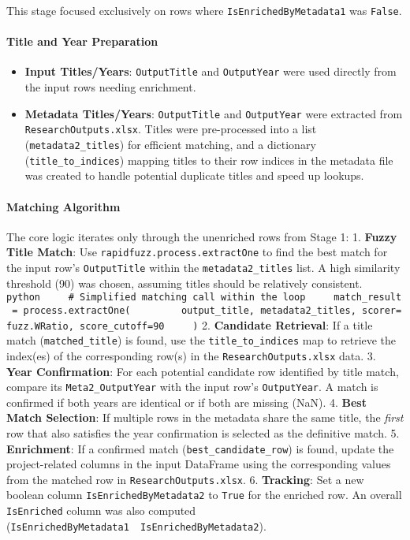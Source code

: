 \documentclass[12pt]{article}
\providecommand{\tightlist}{%
  \setlength{\itemsep}{0pt}\setlength{\parskip}{0pt}}
\begin{document}
This stage focused exclusively on rows where
\texttt{IsEnrichedByMetadata1} was \texttt{False}.

\paragraph{Title and Year
Preparation}\label{title-and-year-preparation}

\begin{itemize}
\tightlist
\item
  \textbf{Input Titles/Years}: \texttt{OutputTitle} and
  \texttt{OutputYear} were used directly from the input rows needing
  enrichment.
\item
  \textbf{Metadata Titles/Years}: \texttt{OutputTitle} and
  \texttt{OutputYear} were extracted from \texttt{ResearchOutputs.xlsx}.
  Titles were pre-processed into a list (\texttt{metadata2\_titles}) for
  efficient matching, and a dictionary (\texttt{title\_to\_indices})
  mapping titles to their row indices in the metadata file was created
  to handle potential duplicate titles and speed up lookups.
\end{itemize}

\paragraph{Matching Algorithm}\label{matching-algorithm-1}

The core logic iterates only through the unenriched rows from Stage 1:
1. \textbf{Fuzzy Title Match}: Use \texttt{rapidfuzz.process.extractOne}
to find the best match for the input row's \texttt{OutputTitle} within
the \texttt{metadata2\_titles} list. A high similarity threshold (90)
was chosen, assuming titles should be relatively consistent.
\texttt{python\ \ \ \ \ \#\ Simplified\ matching\ call\ within\ the\ loop\ \ \ \ \ match\_result\ =\ process.extractOne(\ \ \ \ \ \ \ \ \ output\_title,\ metadata2\_titles,\ scorer=fuzz.WRatio,\ score\_cutoff=90\ \ \ \ \ )}
2. \textbf{Candidate Retrieval}: If a title match
(\texttt{matched\_title}) is found, use the \texttt{title\_to\_indices}
map to retrieve the index(es) of the corresponding row(s) in the
\texttt{ResearchOutputs.xlsx} data. 3. \textbf{Year Confirmation}: For
each potential candidate row identified by title match, compare its
\texttt{Meta2\_OutputYear} with the input row's \texttt{OutputYear}. A
match is confirmed if both years are identical or if both are missing
(NaN). 4. \textbf{Best Match Selection}: If multiple rows in the
metadata share the same title, the \emph{first} row that also satisfies
the year confirmation is selected as the definitive match. 5.
\textbf{Enrichment}: If a confirmed match
(\texttt{best\_candidate\_row}) is found, update the project-related
columns in the input DataFrame using the corresponding values from the
matched row in \texttt{ResearchOutputs.xlsx}. 6. \textbf{Tracking}: Set
a new boolean column \texttt{IsEnrichedByMetadata2} to \texttt{True} for
the enriched row. An overall \texttt{IsEnriched} column was also
computed
(\texttt{IsEnrichedByMetadata1\ \textbar{}\ IsEnrichedByMetadata2}).
\end{document}
